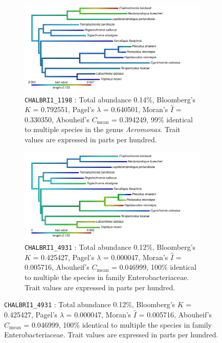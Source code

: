 
\begin{figure}
    \centering
    \begin{subfigure}[t]{}
        \includegraphics[width=\textwidth*0.45]{FishPoo/figures/phylosig_heattree_highsig}
        \small
        \caption{{\tt CHALBRI1\_1198} : Total abundance 0.14\%, 
        Bloomberg's $K$ = 0.792551,
        Pagel's $\lambda$ = 0.640501,
        Moran's $\hat{I}$ = 0.330350, 
        Abouheif's $C_{\mathrm{mean}}$ = 0.394249, 
        99\% identical to multiple species in the genus {\em Aeromonas}. Trait values are expressed in parts per hundred.}
    \end{subfigure}
    \begin{subfigure}[t]{}
        \includegraphics[width=\textwidth*0.45]{FishPoo/figures/phylosig_heattree_lowsig}
        \small
        \caption{{\tt CHALBRI1\_4931} : Total abundance 0.12\%,
        Bloomberg's $K$ = 0.425427,
        Pagel's $\lambda$ = 0.000047,
        Moran's $\hat{I}$ = 0.005716,
        Abouheif's $C_{\mathrm{mean}}$ = 0.046999,
        100\% identical to multiple the species in family Enterobacteriaceae. Trait values are expressed in parts per hundred.}
    \end{subfigure}

\end{figure}
